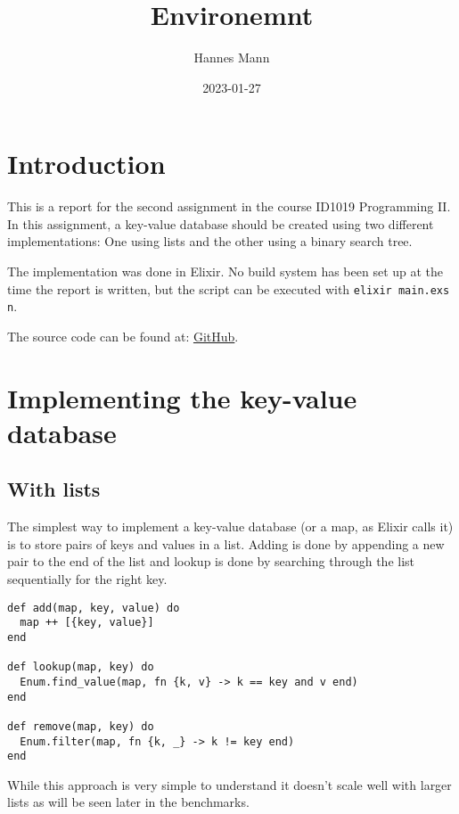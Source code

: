 \documentclass[a4paper,11pt]{article}
\begin{document}
\title{
    \textbf{Environemnt}
}
\author{Hannes Mann}
\date{2023-01-27}

\maketitle

\section*{Introduction}

This is a report for the second assignment in the course ID1019 Programming II.
In this assignment, a key-value database should be created using two different implementations: One using lists and the other using a binary search tree.

The implementation was done in Elixir. No build system has been set up at the time the report is written, but the script can be executed with \texttt{elixir main.exs {n}}.

The source code can be found at: \href{https://github.com/hannesmann/ID1019/tree/main/src/environment}{GitHub}.

\section*{Implementing the key-value database}

\subsection*{With lists}

The simplest way to implement a key-value database (or a map, as Elixir calls it) is to store pairs of keys and values in a list.
Adding is done by appending a new pair to the end of the list and lookup is done by searching through the list sequentially for the right key.

\begin{verbatim}
def add(map, key, value) do
  map ++ [{key, value}]
end

def lookup(map, key) do
  Enum.find_value(map, fn {k, v} -> k == key and v end)
end

def remove(map, key) do
  Enum.filter(map, fn {k, _} -> k != key end)
end
\end{verbatim}

While this approach is very simple to understand it doesn't scale well with larger lists as will be seen later in the benchmarks.
\end{document}

